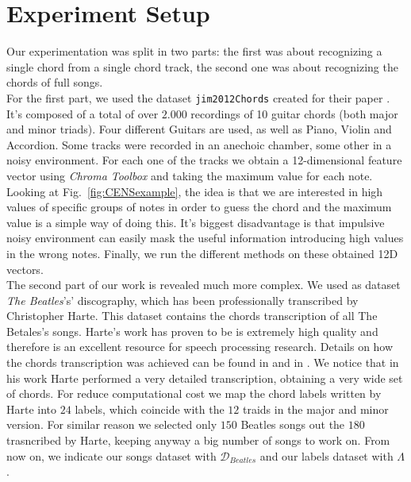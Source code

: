 \section{Experiment Setup}
\label{sec:setup}

Our experimentation was split in two parts: the first was about recognizing a single chord from a single chord track, the second one was about recognizing the chords of full songs.\\
%
For the first part, we used the dataset \texttt{jim2012Chords} \cite{jim2012Chords} created for their paper \cite{JimChordsPaper}. It's composed of a total of over $2.000$ recordings of 10 guitar chords (both major and minor triads). Four different Guitars are used, as well as Piano, Violin and Accordion. Some tracks were recorded in an anechoic chamber, some other in a noisy environment. For each one of the tracks we obtain a 12-dimensional feature vector using \textit{Chroma Toolbox} and taking the maximum value for each note. Looking at Fig.~\ref{fig:CENSexample}, the idea is that we are interested in high values of specific groups of notes in order to guess the chord and the maximum value is a simple way of doing this. It's biggest disadvantage is that impulsive noisy environment can easily mask the useful information introducing high values in the wrong notes. Finally, we run the different methods on these obtained 12D vectors.\\
%
The second part of our work is revealed much more complex. We used as dataset \textit{The Beatles}'s' discography, which has been professionally transcribed by Christopher Harte. This dataset contains the chords transcription of all The Betales's songs. Harte's work has proven to be is extremely high quality and therefore is an excellent resource for speech processing research. Details on how the chords transcription was achieved can be found in \cite{HartePaper} and in \cite{HarteThesis}. We notice that in his work Harte performed a very detailed transcription, obtaining a very wide set of chords. For reduce computational cost we map the chord labels written by Harte into $24$ labels, which coincide with the $12$ traids in the major and minor version. For similar reason we selected only $150$ Beatles songs out the $180$ trasncribed by Harte, keeping anyway a big number of songs to work on. From now on, we indicate our songs dataset with $\mathcal{D}_{Beatles}$ and our labels dataset with $\Lambda$. \\
%

